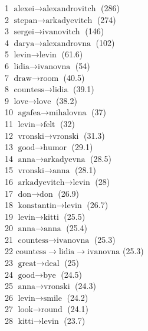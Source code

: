 \begin{appendices}
     1  $ \text{alexei} \to \text{alexandrovitch} $ (286) \\
     2  $ \text{stepan} \to \text{arkadyevitch} $ (274) \\
     3  $ \text{sergei} \to \text{ivanovitch} $ (146) \\
     4  $ \text{darya} \to \text{alexandrovna} $ (102) \\
     5  $ \text{levin} \to \text{levin} $ (61.6) \\
     6  $ \text{lidia} \to \text{ivanovna} $ (54) \\
     7  $ \text{draw} \to \text{room} $ (40.5) \\
     8  $ \text{countess} \to \text{lidia} $ (39.1) \\
     9  $ \text{love} \to \text{love} $ (38.2) \\
    10  $ \text{agafea} \to \text{mihalovna} $ (37) \\
    11  $ \text{levin} \to \text{felt} $ (32) \\
    12  $ \text{vronski} \to \text{vronski} $ (31.3) \\
    13  $ \text{good} \to \text{humor} $ (29.1) \\
    14  $ \text{anna} \to \text{arkadyevna} $ (28.5) \\
    15  $ \text{vronski} \to \text{anna} $ (28.1) \\
    16  $ \text{arkadyevitch} \to \text{levin} $ (28) \\
    17  $ \text{don} \to \text{don} $ (26.9) \\
    18  $ \text{konstantin} \to \text{levin} $ (26.7) \\
    19  $ \text{levin} \to \text{kitti} $ (25.5) \\
    20  $ \text{anna} \to \text{anna} $ (25.4) \\
    21  $ \text{countess} \to \text{ivanovna} $ (25.3) \\
    22  $ \text{countess} \to \text{lidia} \to \text{ivanovna} $ (25.3) \\
    23  $ \text{great} \to \text{deal} $ (25) \\
    24  $ \text{good} \to \text{bye} $ (24.5) \\
    25  $ \text{anna} \to \text{vronski} $ (24.3) \\
    26  $ \text{levin} \to \text{smile} $ (24.2) \\
    27  $ \text{look} \to \text{round} $ (24.1) \\
    28  $ \text{kitti} \to \text{levin} $ (23.7) \\

\end{appendices}
